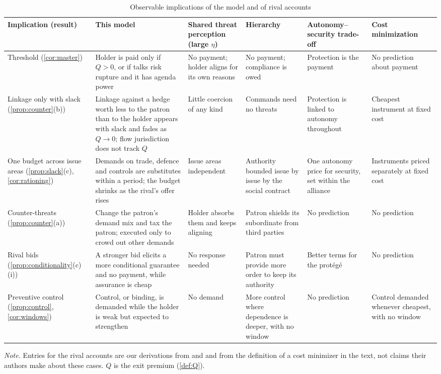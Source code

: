 \begin{table}[t]
\centering
\scriptsize
\setlength{\tabcolsep}{3pt}
\caption{Observable implications of the model and of rival accounts}\label{tab:implications}
\begin{tabularx}{\textwidth}{@{}>{\raggedright\arraybackslash}p{2.35cm}*{5}{>{\raggedright\arraybackslash}X}@{}}
\toprule
Implication (result) & This model & Shared threat perception (large $\eta$) & Hierarchy & Autonomy--security trade-off & Cost minimization\\
\midrule
Threshold (\cref{cor:master}) & Holder is paid only if $Q>0$, or if talks risk rupture and it has agenda power & No payment; holder aligns for its own reasons & No payment; compliance is owed & Protection is the payment & No prediction about payment\\
\addlinespace
Linkage only with slack (\cref{prop:counter}(b)) & Linkage against a hedge worth less to the patron than to the holder appears with slack and fades as $Q\to0$; flow jurisdiction does not track $Q$ & Little coercion of any kind & Commands need no threats & Protection is linked to autonomy throughout & Cheapest instrument at fixed cost\\
\addlinespace
One budget across issue areas (\cref{prop:slack}(c), \cref{cor:rationing}) & Demands on trade, defence and controls are substitutes within a period; the budget shrinks as the rival's offer rises & Issue areas independent & Authority bounded issue by issue by the social contract & One autonomy price for security, set within the alliance & Instruments priced separately at fixed cost\\
\addlinespace
Counter-threats (\cref{prop:counter}(a)) & Change the patron's demand mix and tax the patron; executed only to crowd out other demands & Holder absorbs them and keeps aligning & Patron shields its subordinate from third parties & No prediction & No prediction\\
\addlinespace
Rival bids (\cref{prop:conditionality}(c)(i)) & A stronger bid elicits a more conditional guarantee and no payment, while assurance is cheap & No response needed & Patron must provide more order to keep its authority & Better terms for the protégé & No prediction\\
\addlinespace
Preventive control (\cref{prop:control}, \cref{cor:windows}) & Control, or binding, is demanded while the holder is weak but expected to strengthen & No demand & More control where dependence is deeper, with no window & No prediction & Control demanded whenever cheapest, with no window\\
\bottomrule
\end{tabularx}
\par\smallskip
\begin{minipage}{\textwidth}\scriptsize
\emph{Note.} Entries for the rival accounts are our derivations from \citet{lake2009hierarchy} and \citet{morrow1991alliances} and from the definition of a cost minimizer in the text, not claims their authors make about these cases. $Q$ is the exit premium (\cref{def:Q}).
\end{minipage}
\end{table}


